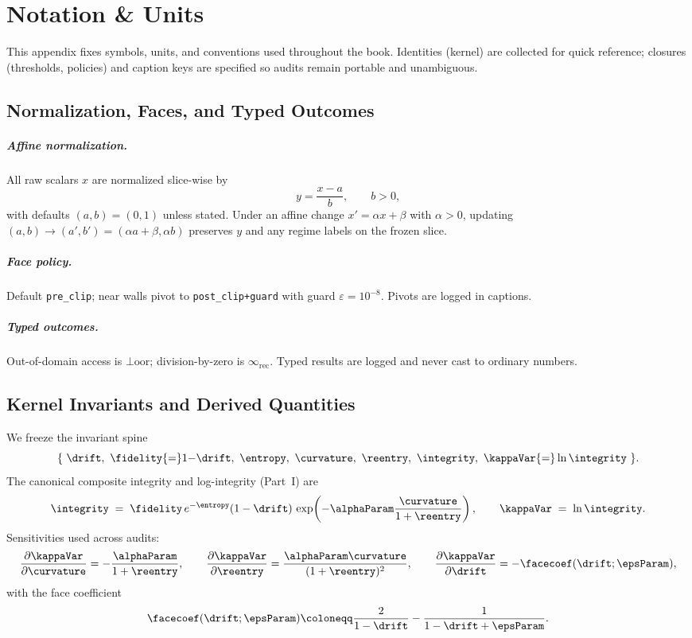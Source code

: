 \chapter{Notation \& Units}
\label{apx:notation}

This appendix fixes symbols, units, and conventions used throughout the book. Identities (kernel) are collected for quick reference; closures (thresholds, policies) and caption keys are specified so audits remain portable and unambiguous.

\section{Normalization, Faces, and Typed Outcomes}
\label{apx:normalization}
\paragraph{Affine normalization.}
All raw scalars \(x\) are normalized slice-wise by
\[
  y=\frac{x-a}{b},\qquad b>0,
\]
with defaults \((a,b)=(0,1)\) unless stated. Under an affine change \(x'=\alpha x+\beta\) with \(\alpha>0\), updating \((a,b)\to(a',b')=(\alpha a+\beta,\alpha b)\) preserves \(y\) and any regime labels on the frozen slice.

\paragraph{Face policy.}
Default \texttt{pre\_clip}; near walls pivot to \texttt{post\_clip+guard} with guard \(\varepsilon=10^{-8}\). Pivots are logged in captions.

\paragraph{Typed outcomes.}
Out-of-domain access is \(\bot\!\mathrm{oor}\); division-by-zero is \(\infty_{\mathrm{rec}}\). Typed results are logged and never cast to ordinary numbers.

\section{Kernel Invariants and Derived Quantities}
\label{apx:invariants}
We freeze the invariant spine
\[
  \{\ \drift,\ \fidelity{=}1{-}\drift,\ \entropy,\ \curvature,\ \reentry,\ \integrity,\ \kappaVar{=}\ln\integrity\ \}.
\]
The canonical composite integrity and log-integrity (Part~I) are
\[
\integrity \;=\; \fidelity\,e^{-\entropy}(1-\drift)\,
\exp\!\left(-\alphaParam \frac{\curvature}{1+\reentry}\right),
\qquad
\kappaVar \;=\; \ln \integrity.
\]
Sensitivities used across audits:
\[
\frac{\partial \kappaVar}{\partial \curvature}=-\frac{\alphaParam}{1+\reentry},\qquad
\frac{\partial \kappaVar}{\partial \reentry}= \frac{\alphaParam \curvature}{(1+\reentry)^2},\qquad
\frac{\partial \kappaVar}{\partial \drift}= -\facecoef(\drift;\epsParam),
\]
with the face coefficient
\[
\facecoef(\drift;\epsParam)\coloneqq \frac{2}{1-\drift}-\frac{1}{1-\drift+\epsParam}.
\]

